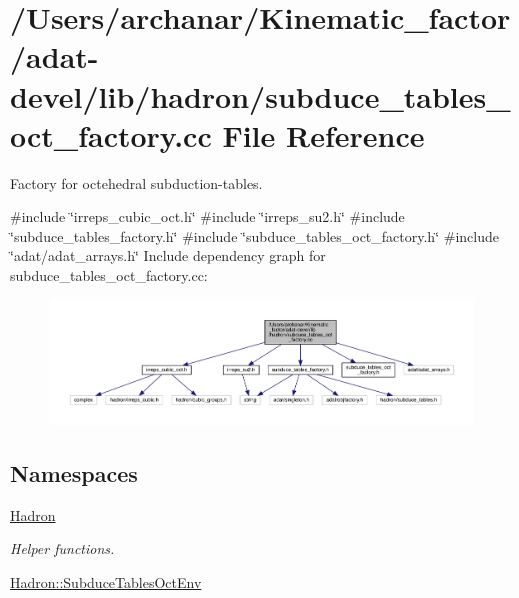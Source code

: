 \hypertarget{adat-devel_2lib_2hadron_2subduce__tables__oct__factory_8cc}{}\section{/\+Users/archanar/\+Kinematic\+\_\+factor/adat-\/devel/lib/hadron/subduce\+\_\+tables\+\_\+oct\+\_\+factory.cc File Reference}
\label{adat-devel_2lib_2hadron_2subduce__tables__oct__factory_8cc}


Factory for octehedral subduction-\/tables.  


{\ttfamily \#include \char`\"{}irreps\+\_\+cubic\+\_\+oct.\+h\char`\"{}}\newline
{\ttfamily \#include \char`\"{}irreps\+\_\+su2.\+h\char`\"{}}\newline
{\ttfamily \#include \char`\"{}subduce\+\_\+tables\+\_\+factory.\+h\char`\"{}}\newline
{\ttfamily \#include \char`\"{}subduce\+\_\+tables\+\_\+oct\+\_\+factory.\+h\char`\"{}}\newline
{\ttfamily \#include \char`\"{}adat/adat\+\_\+arrays.\+h\char`\"{}}\newline
Include dependency graph for subduce\+\_\+tables\+\_\+oct\+\_\+factory.\+cc\+:
\nopagebreak
\begin{figure}[H]
\begin{center}
\leavevmode
\includegraphics[width=350pt]{d2/d52/adat-devel_2lib_2hadron_2subduce__tables__oct__factory_8cc__incl}
\end{center}
\end{figure}
\subsection*{Namespaces}
\begin{DoxyCompactItemize}
\item 
 \mbox{\hyperlink{namespaceHadron}{Hadron}}
\begin{DoxyCompactList}\small\item\em Helper functions. \end{DoxyCompactList}\item 
 \mbox{\hyperlink{namespaceHadron_1_1SubduceTablesOctEnv}{Hadron\+::\+Subduce\+Tables\+Oct\+Env}}
\end{DoxyCompactItemize}
